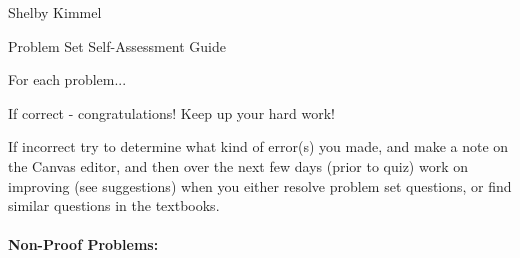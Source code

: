 \documentclass[12pt]{article}
\theoremstyle{definition}
\begin{document}
\hfill Shelby Kimmel

\begin{center}
{\huge Problem Set Self-Assessment Guide}
\end{center}
For each problem...

If correct - congratulations! Keep up your hard work!

If incorrect try to determine what kind of error(s) you made, and make a note on the Canvas editor, and then over the next few days (prior to quiz) work on improving (see suggestions) when you either resolve problem set questions, or find similar questions in the textbooks.

\paragraph{{\Large{Non-Proof Problems:}}}
\end{document}
